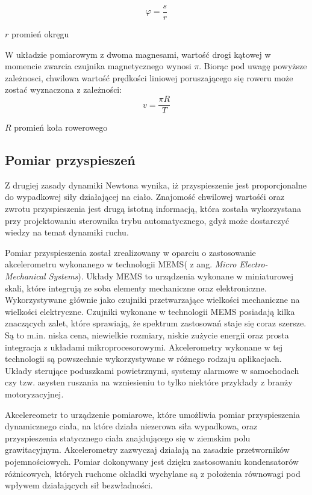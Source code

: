 \begin{equation}
    \varphi = \frac{s}{r}
\end{equation}

\begin{eqwhere}[2cm]
	\item[$r$] promień okręgu
\end{eqwhere}
W układzie pomiarowym z dwoma magnesami, wartość drogi kątowej w momencie zwarcia czujnika magnetycznego wynosi $\pi$. Biorąc pod uwagę powyższe zależnosci, chwilowa wartość prędkości liniowej poruszającego się roweru może zostać wyznaczona z zależności:
 \begin{equation}
v = \frac{\pi R}{T}
\end{equation}
\begin{eqwhere}[2cm]
	\item[$R$] promień koła rowerowego
\end{eqwhere}
\subsection{Pomiar przyspieszeń}
Z drugiej zasady dynamiki Newtona wynika, iż przyspieszenie jest proporcjonalne do wypadkowej siły działającej na ciało. Znajomość chwilowej wartośći oraz zwrotu przyspieszenia jest drugą istotną informacją, która została wykorzystana przy projektowaniu sterownika trybu automatycznego, gdyż może dostarczyć wiedzy na temat dynamiki ruchu.

Pomiar przyspieszenia został zrealizowany w oparciu o zastosowanie akcelerometru wykonanego w technologii MEMS( z ang. {\em Micro Electro-Mechanical Systems}). Układy MEMS to urządzenia wykonane w miniaturowej skali, które integrują ze soba elementy mechaniczne oraz elektroniczne. Wykorzystywane głównie jako czujniki przetwarzające wielkości mechaniczne na wielkości elektryczne. Czujniki wykonane w technologii MEMS posiadają kilka znaczących zalet, które sprawiają, że spektrum zastosowań staje się coraz szersze. Są to m.in. niska cena, niewielkie rozmiary, niskie zużycie energii oraz prosta integracja z układami mikroprocesorowymi. Akcelerometry wykonane w tej technologii są powszechnie wykorzystywane w różnego rodzaju aplikacjach. Układy sterujące poduszkami powietrznymi, systemy alarmowe w samochodach czy tzw. asysten ruszania na wzniesieniu to tylko niektóre przykłady z branży motoryzacyjnej.

Akcelereometr to urządzenie pomiarowe, które umożliwia pomiar przyspieszenia dynamicznego ciała, na które działa niezerowa siła wypadkowa, oraz przyspieszenia statycznego ciała znajdującego się w ziemskim polu grawitacyjnym. Akcelerometry zazwyczaj działają na zasadzie przetworników pojemnościowych. Pomiar dokonywany jest dzięku zastosowaniu kondensatorów różnicowych, których ruchome okładki wychylane są z położenia równowagi pod wpływem działających sił bezwładności.

